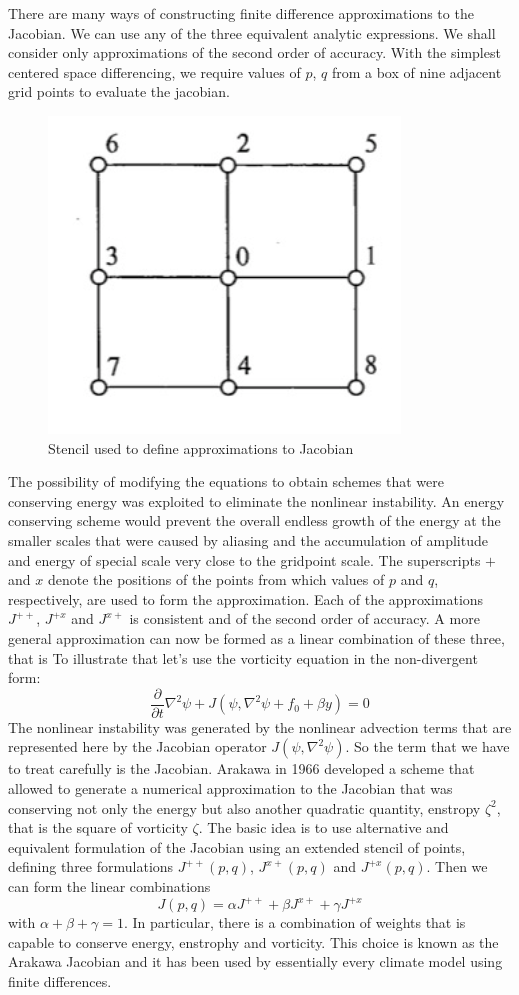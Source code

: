 There are many ways of constructing finite difference approximations to the Jacobian. We can use any of the three equivalent analytic expressions. We shall consider only approximations of the second order of accuracy. With the simplest centered space differencing, we require values of $p$, $q$ from a box of nine adjacent grid points to evaluate the jacobian.
\begin{figure}[h]
    \centering
    \includegraphics[width=0.25\linewidth]{uploads/Screenshot 2024-11-13 174915.png}
    \caption{Stencil used to define approximations to Jacobian}
    \label{fig:4.7.2}
\end{figure}
The possibility of modifying the equations to obtain schemes that were conserving energy was exploited to eliminate the nonlinear instability. An energy conserving scheme would prevent the overall endless growth of the energy at the smaller scales that were caused by aliasing and the accumulation of amplitude and energy of special scale very close to the gridpoint scale.
The superscripts $+$ and $x$ denote the positions of the points from which values of $p$ and $q$, respectively, are used to form the approximation. Each of the approximations $J^{++}$, $J^{+x}$ and $J^{x+}$ is consistent and of the second order of accuracy. A more general approximation can now be formed as a linear combination of these three, that is
To illustrate that let's use the vorticity equation in the non-divergent form:
\begin{equation}
    \frac{\partial}{\partial t}\nabla^2\psi+J(\psi, \nabla^2\psi+f_0+\beta y)=0
\end{equation}
The nonlinear instability was generated by the nonlinear advection terms that are represented here by the Jacobian operator $J(\psi, \nabla^2\psi)$. So the term that we have to treat carefully is the Jacobian. Arakawa in 1966 developed a scheme that allowed to generate a numerical approximation to the Jacobian that was conserving not only the energy but also another quadratic quantity, enstropy $\zeta^2$, that is the square of vorticity $\zeta$.
The basic idea is to use alternative and equivalent formulation of the Jacobian using an extended stencil of points, defining three formulations $J^{++}(p,q)$, $J^{x+}(p,q)$ and $J^{+x}(p,q)$. Then we can form the linear combinations $$J(p,q)=\alpha J^{++}+\beta J^{x+}+\gamma J^{+x}$$ with $\alpha+\beta+\gamma=1$. In particular, there is a combination of weights that is capable to conserve energy, enstrophy and vorticity. This choice is known as the Arakawa Jacobian and it has been used by essentially every climate model using finite differences. 
